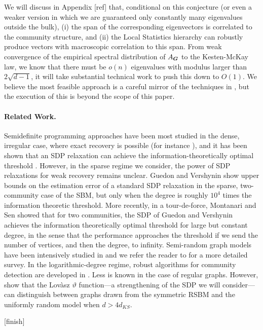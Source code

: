We will discuss in Appendix [ref] that, conditional on this conjecture (or even a weaker version in which we are guaranteed only constantly many eigenvalues outside the bulk), (i) the span of the corresponding eigenvectors is correlated to the community structure, and (ii) the Local Statistics hierarchy can robustly produce vectors with macroscopic correlation to this span. From weak convergence of the empirical spectral distribution of $A_{\boldsymbol{G}}$ to the Kesten-McKay law, we know that there must be $o(n)$ eigenvalues with modulus larger than $2\sqrt{d-1}$, it will take substantial technical work to push this down to $O(1)$. We believe the most feasible approach is a careful mirror of the techniques in \cite{bordenave2015non}, but the execution of this is beyond the scope of this paper.

\paragraph{Related Work.}

Semidefinite programming approaches have been most studied in the dense, irregular case, where exact recovery is possible (for instance \cite{abbe2016exact,abbe2015community}), and it has been shown that an SDP relaxation can achieve the information-theoretically optimal threshold \cite{hajek2016achieving}. However, in the sparse regime we consider, the power of SDP relaxations for weak recovery remains unclear. Guedon and Vershynin \cite{guedon2016community} show upper bounds on the estimation error of a standard SDP relaxation in the sparse, two-community case of the SBM, but only when the degree is roughly $10^4$ times the information theoretic threshold. More recently, in a tour-de-force,  Montanari and Sen \cite{montanari2015semidefinite} showed that for two communities, the SDP of Guedon and Vershynin achieves the information theoretically optimal threshold for large but constant degree, in the sense that the performance approaches the threshold if we send the number of vertices, and then the degree, to infinity.  Semi-random graph models have been intensively studied in \cite{blum1995coloring, feige2000finding, feige2001heuristics,coja2004coloring,krivelevich2006semirandom,coja2007solving, makarychev2012approximation, chen2014clustering,guedon2016community} and we refer the reader to \cite{makarychev2016learning} for a more detailed survey. In the logarithmic-degree regime, robust algorithms for community detection are developed in \cite{cai2015robust, kumar2010clustering, awasthi2012improved}. Less is known in the case of regular graphs. However, \cite{banks2017lov} show that the Lov\`{a}sz $\vartheta$ function---a strengthening of the SDP we will consider---can distinguish between graphs drawn from the symmetric RSBM and the uniformly random model when $d > 4d_{KS}$.

[finish]

